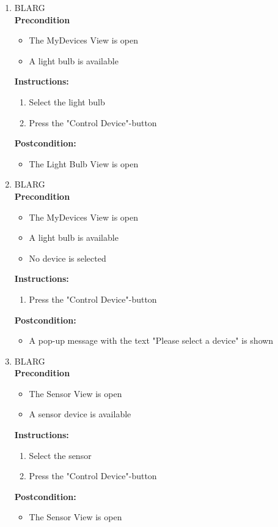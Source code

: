 \documentclass[a4paper]{article}
\newlength{\testlabellength}
\newenvironment{testlist}{\begin{enumerate}[label=\bfseries Instruction \thesubsection.\arabic* , labelindent=0pt, labelwidth=\testlabellength , leftmargin=2cm]}{\end{enumerate}}
\newenvironment{precondition}{
{\color{white}BLARG}\\ 
\textbf{Precondition}
\begin{itemize}[labelindent=0cm, labelwidth=2cm , leftmargin=1cm]
}
{\end{itemize}}
\newenvironment{instruction}{
\textbf{Instructions:}
\begin{enumerate}[label=\bfseries  \arabic*., labelindent=0cm, labelwidth=2cm , leftmargin=1cm]
}
{\end{enumerate}}
\newenvironment{postcondition}{
\textbf{Postcondition:}
\begin{itemize}[labelindent=0cm, labelwidth=2cm , leftmargin=1cm]
}
{\end{itemize}}
\begin{document}
\begin{appendices}
\begin{testlist}
	\item
		\begin{precondition}
			\item The MyDevices View is open
			\item A light bulb is available
		\end{precondition}
		\begin{instruction}
			\item Select the light bulb
			\item Press the "Control Device"-button
		\end{instruction}
		\begin{postcondition}
			\item The Light Bulb View is open
		\end{postcondition}


	\item \label{SystemTest1}
		\begin{precondition}
			\item The MyDevices View is open
			\item A light bulb is available
			\item No device is selected
		\end{precondition}
		\begin{instruction}
			\item Press the "Control Device"-button
		\end{instruction}
		\begin{postcondition}
			\item A pop-up message with the text "Please select a device" is shown
		\end{postcondition}	


	\item
		\begin{precondition}
			\item The Sensor View is open
			\item A sensor device is available
		\end{precondition}
		\begin{instruction}
			\item Select the sensor
			\item Press the "Control Device"-button
		\end{instruction}
		\begin{postcondition}
			\item The Sensor View is open
		\end{postcondition}


\end{testlist}
\end{appendices}
\end{document}
